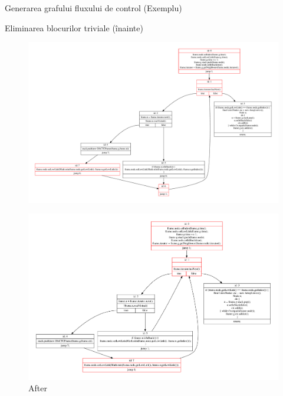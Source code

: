 \documentclass{beamer}
\begin{document}
\begin{frame}{Generarea grafului fluxului de control (Exemplu)}
\begin{figure}[htb]
\begin{subfigure}{.42\textwidth}
        \end{subfigure}
    \end{figure}
\end{frame}

\begin{frame}{Eliminarea blocurilor triviale (înainte)}
    \begin{figure}[htb]
        \centering
        \includegraphics[width=\linewidth]{../../../theses/diploma/src/graph/trivial-before.pdf}
    \end{figure}
    \begin{figure}[htb]
        \centering
        \includegraphics[width=\linewidth]{../../../theses/diploma/src/graph/trivial-after.pdf}
        \caption{After}
    \end{figure}
\end{frame}
\end{document}
